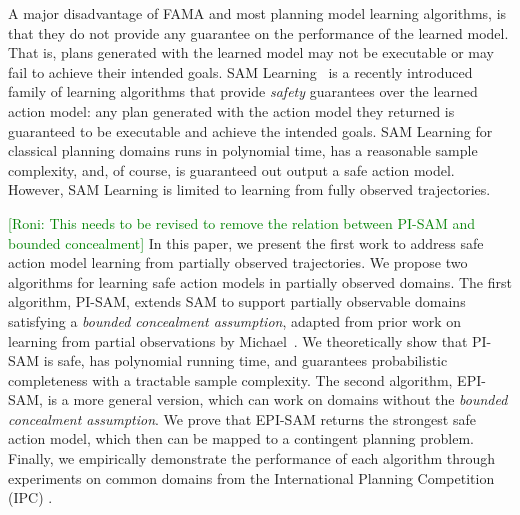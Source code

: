 \documentclass[letterpaper]{article} %
\newcommand{\roni}[1]{{\textcolor{green}{[Roni: #1]}}}
\begin{document}
A major disadvantage of FAMA and most planning model learning algorithms, is that they do not provide any guarantee on the performance of the learned model. That is, plans generated with the learned model may not be executable or may fail to achieve their intended goals. 
SAM Learning~\cite{stern2017efficientAndSafe,juba2021safe,juba2022learning,mordoch2022collaborative} is a recently introduced family of learning algorithms that provide \emph{safety} guarantees over the learned action model: any plan generated with the action model they returned is guaranteed to be executable and achieve the intended goals. SAM Learning for classical planning domains runs in polynomial time, has a reasonable sample complexity, and, of course, is guaranteed out output a safe action model. However, SAM Learning is limited to learning from fully observed trajectories. 

\roni{This needs to be revised to remove the relation between PI-SAM and bounded concealment}
In this paper, we present the first work to address safe action model learning from partially observed trajectories. 
We propose two algorithms for learning safe action models in partially observed domains. 
The first algorithm, PI-SAM, extends SAM \cite{juba2021safe} to support partially observable domains satisfying a \textit{bounded concealment assumption}, adapted from prior work on learning from partial observations by Michael~. 
We theoretically show that PI-SAM is safe, has polynomial running time, and guarantees probabilistic completeness with a tractable sample complexity. The second algorithm, EPI-SAM, is a more general version, which can work on domains without the \textit{bounded concealment assumption}. We prove that EPI-SAM returns the strongest safe action model, which then can be mapped to a contingent planning problem. Finally, we empirically demonstrate the performance of each algorithm through experiments on common domains from the International Planning Competition (IPC) \cite{ipc}. 








\end{document}
